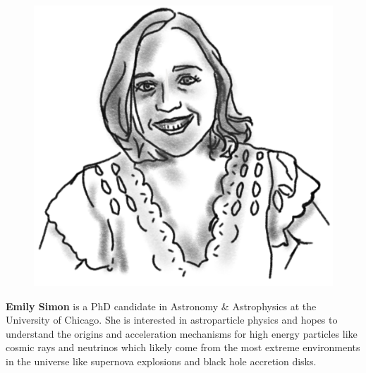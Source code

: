 \begin{figure}
\vspace{-0.5\intextsep}
\includegraphics[width=0.9\linewidth]{portraits/emily.png}
\end{figure}
\textbf{Emily Simon} is a PhD candidate in Astronomy \& Astrophysics at the University of Chicago. She is interested in astroparticle physics and hopes to understand the origins and acceleration mechanisms for high energy particles like cosmic rays and neutrinos which likely come from the most extreme environments in the universe like supernova explosions and black hole accretion disks.\\
\\

